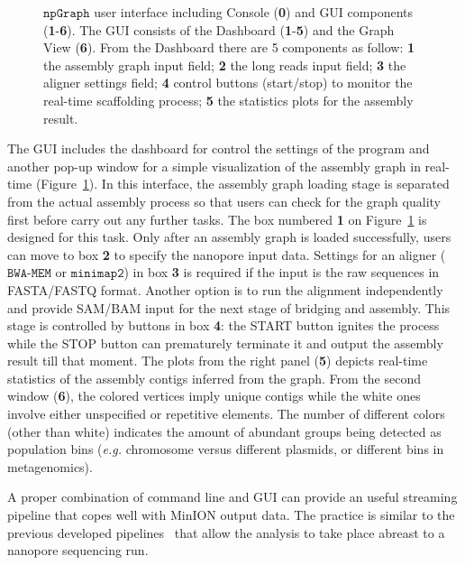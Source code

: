 \documentclass[10pt,twocolumn,twoside]{genpaper}
\newcommand{\npgraph}{$\mathtt{npGraph}$}
\newcommand{\minimap}{$\mathtt{minimap2}$}
\newcommand{\bwa}{$\mathtt{BWA\text{-}MEM}$}
\newcommand{\EG}{\emph{e.g.}}
\begin{document}
\begin{figure}[!hpt]
{{    }
}
\caption[\npgraph{} user interface]{\npgraph{} user interface including Console (\textbf{0}) and GUI components (\textbf{1}-\textbf{6}). The GUI consists of the Dashboard (\textbf{1}-\textbf{5}) and the Graph View (\textbf{6}). From the Dashboard there are 5 components as follow: \textbf{1} the assembly graph input field; \textbf{2} the long reads input field; \textbf{3} the aligner settings field; \textbf{4} control buttons (start/stop) to monitor the real-time scaffolding process; \textbf{5} the statistics plots for the assembly result.}
\label{figure:npgraph_gui}
\end{figure}

The GUI includes the dashboard for control the settings of the program and another pop-up window for a simple visualization of the assembly graph in real-time (Figure~\ref{figure:npgraph_gui}).
In this interface, the assembly graph loading stage is separated from the actual assembly process so that users can check for the graph quality first before carry out any further tasks. The box numbered \textbf{1} on Figure~\ref{figure:npgraph_gui} is designed for this task.
Only after an assembly graph is loaded successfully, users can move to box \textbf{2} to specify the nanopore input data.
Settings for an aligner (\bwa{} or \minimap{}) in box \textbf{3} is required if the input is the raw sequences in FASTA/FASTQ format. Another option is to run the alignment independently and provide SAM/BAM input for the next stage of bridging and assembly. This stage is controlled by buttons in box \textbf{4}: the START button ignites the process while the STOP button can prematurely terminate it and output the assembly result till that moment. The plots from the right panel (\textbf{5}) depicts real-time statistics of the assembly contigs inferred from the graph.
From the second window (\textbf{6}), the colored vertices imply unique contigs while the white ones involve either unspecified or repetitive elements. The number of different colors (other than white) indicates the amount of abundant groups being detected as population bins (\EG{} chromosome versus different plasmids, or different bins in metagenomics).

A proper combination of command line and GUI can provide an useful streaming pipeline that copes well with MinION output data. The practice is similar to the previous developed pipelines~\cite{CaoGC2016,Cao2017scaffolding,Nguyen2017barcode} that allow the analysis to take place abreast to a nanopore sequencing run.
\end{document}
